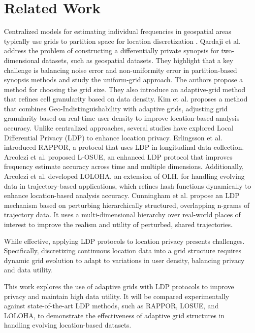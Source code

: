 \section{Related Work}
\label{sec:related_work}

Centralized models for estimating individual frequencies in geospatial areas typically use grids to partition space for location discretization \cite{DBLP:conf/icde/QardajiYL13,wei2019differential,yan2022achieving}. Qardaji et al.  \cite{DBLP:conf/icde/QardajiYL13} address the problem of constructing a differentially private synopsis for two-dimensional datasets, such as geospatial datasets. They highlight that a key challenge is balancing noise error and non-uniformity error in partition-based synopsis methods and study the uniform-grid approach. The authors propose a method for choosing the grid size. They also introduce an adaptive-grid method that refines cell granularity based on data density. Kim et al. \cite{kim2024improving} proposes a method that combines Geo-Indistinguishability \cite{andres2013geo} with adaptive grids, adjusting grid granularity based on real-time user density to improve location-based analysis accuracy. Unlike centralized approaches, several studies have explored Local Differential Privacy (LDP) to enhance location privacy. Erlingsson et al.  \cite{erlingsson2014rappor} introduced RAPPOR, a protocol that uses LDP in longitudinal data collection. Arcolezi et al.  \cite{arcolezi2022improving} proposed L-OSUE, an enhanced LDP protocol that improves frequency estimate accuracy across time and multiple dimensions. Additionally, Arcolezi et al.  \cite{arcolezi2022frequency} developed LOLOHA, an extension of OLH, for handling evolving data in trajectory-based applications, which refines hash functions dynamically to enhance location-based analysis accuracy. Cunningham et al. \cite{cunningham2021real} propose an LDP mechanism based on perturbing hierarchically structured, overlapping n-grams of trajectory data. It uses a multi-dimensional hierarchy over real-world places of interest to improve the realism and utility of perturbed, shared trajectories.

While effective, applying LDP protocols to location privacy presents challenges. Specifically, discretizing continuous location data into a grid structure requires dynamic grid evolution to adapt to variations in user density, balancing privacy and data utility.

This work explores the use of adaptive grids with LDP protocols to improve privacy and maintain high data utility. It will be compared experimentally against state-of-the-art LDP methods, such as RAPPOR, LOSUE, and LOLOHA, to demonstrate the effectiveness of adaptive grid structures in handling evolving location-based datasets. 


